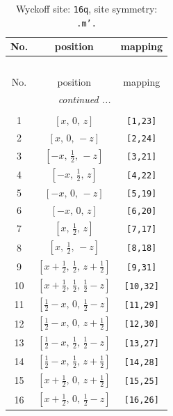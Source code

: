 \documentclass[fleqn,8pt]{jsarticle}
\begin{document}
\renewcommand{\arraystretch}{1.2}
\begin{longtable}{ccc}
\caption{Wyckoff site: {\tt 16q}, site symmetry: {\tt .m'.}}
 \\
 \hline \hline
No. & position & mapping \\ \hline \endfirsthead

\multicolumn{2}{l}{\tablename\ \thetable{}} \\
 \hline \hline
No. & position & mapping \\ \hline \endhead

 \hline \hline
\multicolumn{2}{r}{\footnotesize\it continued ...} \\ \endfoot

 \hline \hline
\multicolumn{2}{r}{} \\ \endlastfoot

1 & $\left[ x,\, 0,\, z \right]$ & {\tt [1,23]} \\ \hline
2 & $\left[ x,\, 0,\, - z \right]$ & {\tt [2,24]} \\ \hline
3 & $\left[ - x,\, \frac{1}{2},\, - z \right]$ & {\tt [3,21]} \\ \hline
4 & $\left[ - x,\, \frac{1}{2},\, z \right]$ & {\tt [4,22]} \\ \hline
5 & $\left[ - x,\, 0,\, - z \right]$ & {\tt [5,19]} \\ \hline
6 & $\left[ - x,\, 0,\, z \right]$ & {\tt [6,20]} \\ \hline
7 & $\left[ x,\, \frac{1}{2},\, z \right]$ & {\tt [7,17]} \\ \hline
8 & $\left[ x,\, \frac{1}{2},\, - z \right]$ & {\tt [8,18]} \\ \hline
9 & $\left[ x + \frac{1}{2},\, \frac{1}{2},\, z + \frac{1}{2} \right]$ & {\tt [9,31]} \\ \hline
10 & $\left[ x + \frac{1}{2},\, \frac{1}{2},\, \frac{1}{2} - z \right]$ & {\tt [10,32]} \\ \hline
11 & $\left[ \frac{1}{2} - x,\, 0,\, \frac{1}{2} - z \right]$ & {\tt [11,29]} \\ \hline
12 & $\left[ \frac{1}{2} - x,\, 0,\, z + \frac{1}{2} \right]$ & {\tt [12,30]} \\ \hline
13 & $\left[ \frac{1}{2} - x,\, \frac{1}{2},\, \frac{1}{2} - z \right]$ & {\tt [13,27]} \\ \hline
14 & $\left[ \frac{1}{2} - x,\, \frac{1}{2},\, z + \frac{1}{2} \right]$ & {\tt [14,28]} \\ \hline
15 & $\left[ x + \frac{1}{2},\, 0,\, z + \frac{1}{2} \right]$ & {\tt [15,25]} \\ \hline
16 & $\left[ x + \frac{1}{2},\, 0,\, \frac{1}{2} - z \right]$ & {\tt [16,26]} \\
\end{longtable}
\end{document}
